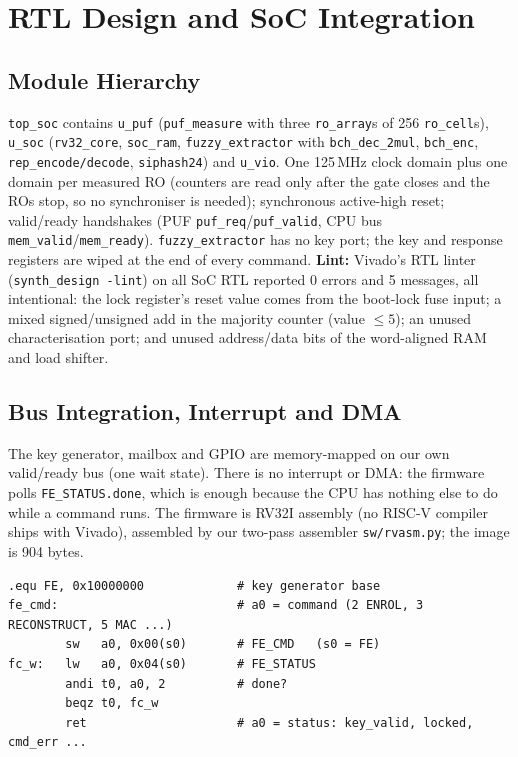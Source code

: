 \documentclass[11pt,a4paper]{article}
\begin{document}
\section{RTL Design and SoC Integration}
\label{sec:rtl}

\subsection{Module Hierarchy}
\texttt{top\_soc} contains \texttt{u\_puf} (\texttt{puf\_measure} with three \texttt{ro\_array}s of 256
\texttt{ro\_cell}s), \texttt{u\_soc} (\texttt{rv32\_core}, \texttt{soc\_ram}, \texttt{fuzzy\_extractor}
with \texttt{bch\_dec\_2mul}, \texttt{bch\_enc}, \texttt{rep\_encode/decode}, \texttt{siphash24}) and
\texttt{u\_vio}. One 125\,MHz clock domain plus one domain per measured RO (counters are read only after
the gate closes and the ROs stop, so no synchroniser is needed); synchronous active-high reset;
valid/ready handshakes (PUF \texttt{puf\_req}/\texttt{puf\_valid}, CPU bus \texttt{mem\_valid}/\texttt{mem\_ready}).
\texttt{fuzzy\_extractor} has no key port; the key and response registers are wiped at the end of every
command. \textbf{Lint:} Vivado's RTL linter (\texttt{synth\_design -lint}) on all SoC RTL reported 0
errors and 5 messages, all intentional: the lock register's reset value comes from the boot-lock fuse
input; a mixed signed/unsigned add in the majority counter (value $\le5$); an unused characterisation
port; and unused address/data bits of the word-aligned RAM and load shifter.

\subsection{Bus Integration, Interrupt and DMA}
The key generator, mailbox and GPIO are memory-mapped on our own valid/ready bus (one wait state).
There is no interrupt or DMA: the firmware polls \texttt{FE\_STATUS.done}, which is enough because the
CPU has nothing else to do while a command runs. The firmware is RV32I assembly (no RISC-V compiler
ships with Vivado), assembled by our two-pass assembler \texttt{sw/rvasm.py}; the image is 904 bytes.

\begin{lstlisting}[language=rvasm,caption={Driver excerpt (\texttt{sw/firmware.S}): issue a key-generator command and wait.},label={lst:driver}]
.equ FE, 0x10000000             # key generator base
fe_cmd:                         # a0 = command (2 ENROL, 3 RECONSTRUCT, 5 MAC ...)
        sw   a0, 0x00(s0)       # FE_CMD   (s0 = FE)
fc_w:   lw   a0, 0x04(s0)       # FE_STATUS
        andi t0, a0, 2          # done?
        beqz t0, fc_w
        ret                     # a0 = status: key_valid, locked, cmd_err ...
\end{lstlisting}
\end{document}
